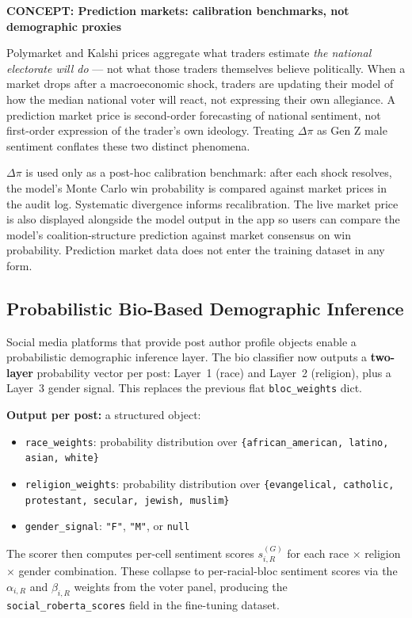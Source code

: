 \documentclass[11pt]{article}
\newcommand{\concept}[2]{%
  \begin{mdframed}[style=conceptbox]
  {\small\bfseries\color{bluefg}CONCEPT: #1}\par\smallskip #2
  \end{mdframed}}
\begin{document}
\concept{Prediction markets: calibration benchmarks, not demographic proxies}{
Polymarket and Kalshi prices aggregate what traders estimate \emph{the national
electorate will do} --- not what those traders themselves believe politically.
When a market drops after a macroeconomic shock, traders are updating their model
of how the median national voter will react, not expressing their own allegiance.
A prediction market price is second-order forecasting of national sentiment, not
first-order expression of the trader's own ideology. Treating $\Delta\pi$ as
Gen Z male sentiment conflates these two distinct phenomena.

$\Delta\pi$ is used only as a post-hoc calibration benchmark: after each shock
resolves, the model's Monte Carlo win probability is compared against market prices
in the audit log. Systematic divergence informs recalibration. The live market price
is also displayed alongside the model output in the app so users can compare the
model's coalition-structure prediction against market consensus on win probability.
Prediction market data does not enter the training dataset in any form.
}

\subsection*{Probabilistic Bio-Based Demographic Inference}

Social media platforms that provide post author profile objects enable a
probabilistic demographic inference layer. The bio classifier now outputs a
\textbf{two-layer} probability vector per post: Layer~1 (race) and Layer~2
(religion), plus a Layer~3 gender signal. This replaces the previous
flat \texttt{bloc\_weights} dict.

\textbf{Output per post:} a structured object:
\begin{itemize}[leftmargin=1.6em, itemsep=2pt]
  \item \texttt{race\_weights}: probability distribution over
        \texttt{\{african\_american, latino, asian, white\}}
  \item \texttt{religion\_weights}: probability distribution over
        \texttt{\{evangelical, catholic, protestant, secular, jewish, muslim\}}
  \item \texttt{gender\_signal}: \texttt{"F"}, \texttt{"M"}, or \texttt{null}
\end{itemize}

The scorer then computes per-cell sentiment scores
$s_{i,R}^{(G)}$ for each race $\times$ religion $\times$ gender combination.
These collapse to per-racial-bloc sentiment scores via the $\alpha_{i,R}$ and
$\beta_{i,R}$ weights from the voter panel, producing the
\texttt{social\_roberta\_scores} field in the fine-tuning dataset.
\end{document}
